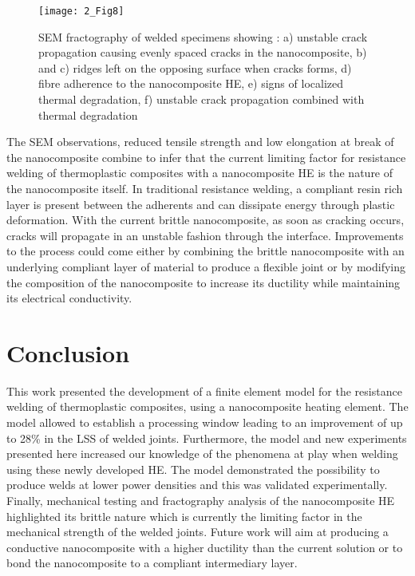\begin{figure}[htb]
	\centering
	\texttt{[image: 2\_Fig8]}
	\caption{SEM fractography of welded specimens showing : a) unstable crack propagation causing evenly spaced cracks in the nanocomposite, b) and c) ridges left on the opposing surface when cracks forms, d) fibre adherence to the nanocomposite HE, e) signs of localized thermal degradation, f) unstable crack propagation combined with thermal degradation \cite{Brassard2019b}}
	\label{fig:2_Fig8}
\end{figure} 

The SEM observations, reduced tensile strength and low elongation at break of the nanocomposite combine to infer that the current limiting factor for resistance welding of thermoplastic composites with a nanocomposite HE is the nature of the nanocomposite itself. 
In traditional resistance welding, a compliant resin rich layer is present between the adherents and can dissipate energy through plastic deformation. 
With the current brittle nanocomposite, as soon as cracking occurs, cracks will propagate in an unstable fashion through the interface. 
Improvements to the process could come either by combining the brittle nanocomposite with an underlying compliant layer of material to produce a flexible joint or by modifying the composition of the nanocomposite to increase its ductility while maintaining its electrical conductivity. 

\FloatBarrier
\section{Conclusion}

This work presented the development of a finite element model for the resistance welding of thermoplastic composites, using a nanocomposite heating element. 
The model allowed to establish a processing window leading to an improvement of up to 28\% in the LSS of welded joints. 
Furthermore, the model and new experiments presented here increased our knowledge of the phenomena at play when welding using these newly developed HE. 
The model demonstrated the possibility to produce welds at lower power densities and this was validated experimentally. 
Finally, mechanical testing and fractography analysis of the nanocomposite HE highlighted its brittle nature which is currently the limiting factor in the mechanical strength of the welded joints. 
Future work will aim at producing a conductive nanocomposite with a higher ductility than the current solution or to bond the nanocomposite to a compliant intermediary layer. 

